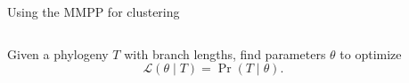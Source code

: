 \documentclass{beamer}
\begin{document}
\begin{frame}[label=steps]{Using the MMPP for clustering}
\begin{columns}
\begin{column}{0.5\textwidth}
        \end{column}
    \end{columns}
    \begin{columns}
        \begin{column}{0.5\textwidth}
            Given a phylogeny $T$ with branch lengths, find parameters $\theta$
            to optimize
            \[
                \mathcal{L}(\theta \mid T) = \Pr(T \mid \theta).
            \]
        \end{column}
        \begin{column}{0.5\textwidth}
        \end{column}
    \end{columns}
\end{frame}
\end{document}
